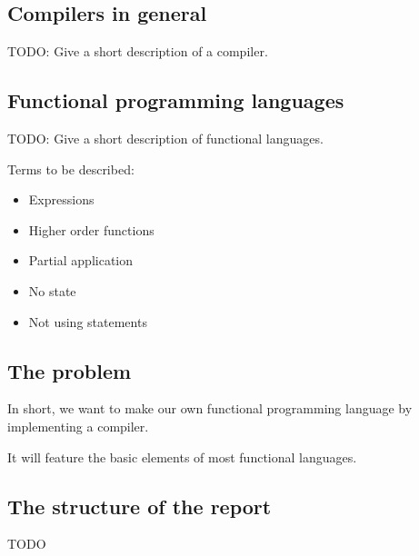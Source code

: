 \subsection{Compilers in general}
TODO: Give a short description of a compiler.

\subsection{Functional programming languages}
TODO: Give a short description of functional languages.

Terms to be described:
\begin{itemize}
\item Expressions
\item Higher order functions
\item Partial application
\item No state
\item Not using statements
\end{itemize}

\subsection{The problem}
In short, we want to make our own functional programming language by implementing a compiler.


It will feature the basic elements of most functional languages.


\subsection{The structure of the report}
TODO
